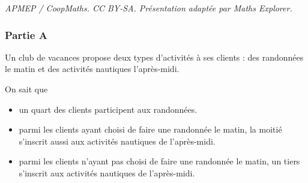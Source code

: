 \documentclass[10pt]{article}
\begin{document}
\noindent\textit{APMEP / CoopMaths. CC BY-SA. Présentation adaptée par Maths Explorer.}\par\medskip
\subsubsection*{Partie A}
Un club de vacances propose deux types d'activités à ses clients : des randonnées le matin et des activités nautiques l'après-midi.

\vspace{5mm}
On sait que
\begin{itemize}[label=$\bullet$]
	\item un quart des clients participent aux randonnées.
	\item parmi les clients ayant choisi de faire une randonnée le matin, la moitié s'inscrit aussi aux activités nautiques de l'après-midi.
	\item parmi les clients n'ayant pas choisi de faire une randonnée le matin, un tiers s'inscrit aux activités nautiques de l'après-midi.
\end{itemize}
\end{document}
